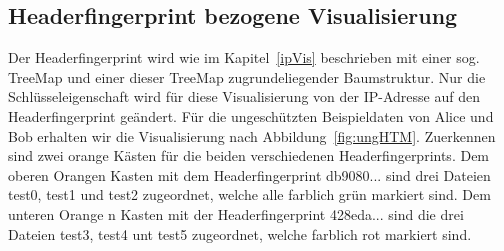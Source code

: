 \documentclass[
    fontsize=12pt,
    headings=small,
    parskip=half,           %
    bibliography=totoc,
    numbers=noenddot,       %
    open=any,               %
    ]{scrreprt}
\begin{document}

    \subsection{Headerfingerprint bezogene Visualisierung}
Der Headerfingerprint wird wie im Kapitel~\ref{ipVis} beschrieben mit einer sog. TreeMap und einer dieser TreeMap zugrundeliegender Baumstruktur.
Nur die Schlüsseleigenschaft wird für diese Visualisierung von der IP-Adresse auf den Headerfingerprint geändert.
Für die ungeschützten Beispieldaten von Alice und Bob erhalten wir die Visualisierung nach Abbildung~\ref{fig:ungHTM}.
Zuerkennen sind zwei orange Kästen für die beiden verschiedenen Headerfingerprints.
Dem oberen Orangen Kasten mit dem Headerfingerprint db9080... sind drei Dateien test0, test1 und test2 zugeordnet, welche alle farblich grün markiert sind.
Dem unteren Orange n Kasten mit der Headerfingerprint 428eda... sind die drei Dateien test3, test4 unt test5 zugeordnet, welche farblich rot markiert sind.
\end{document}
